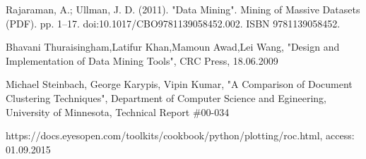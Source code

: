 \begin{thebibliography}{99}
Rajaraman, A.; Ullman, J. D. (2011). "Data Mining". Mining of Massive Datasets (PDF). pp. 1–17. doi:10.1017/CBO9781139058452.002. ISBN 9781139058452.

Bhavani Thuraisingham,Latifur Khan,Mamoun Awad,Lei Wang, "Design and Implementation of Data Mining Tools", CRC Press, 18.06.2009

Michael Steinbach, George Karypis, Vipin Kumar, "A Comparison of Document Clustering Techniques", Department of Computer Science and Egineering,  University of Minnesota, Technical Report \#00-034 

https://docs.eyesopen.com/toolkits/cookbook/python/plotting/roc.html, access: 01.09.2015

\end{thebibliography}